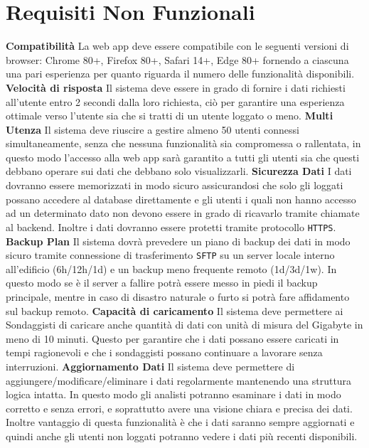 \chapter{Requisiti Non Funzionali} 
    \begin{rnfList}
        \rnfItem \textbf{Compatibilità} La web app deve essere compatibile con le seguenti versioni di browser: Chrome 80+, Firefox 80+, Safari 14+, Edge 80+ fornendo a ciascuna una pari esperienza per quanto riguarda il numero delle funzionalità disponibili.
        \rnfItem \textbf{Velocità di risposta} Il sistema deve essere in grado di fornire i dati richiesti all’utente entro 2 secondi dalla loro richiesta, ciò per garantire una esperienza ottimale verso l’utente sia che si tratti di un utente loggato o meno.
        \rnfItem \textbf{Multi Utenza} Il sistema deve riuscire a gestire almeno 50 utenti connessi simultaneamente, senza che nessuna funzionalità sia compromessa o rallentata, in questo modo l'accesso alla web app sarà garantito a tutti gli utenti sia che questi debbano operare sui dati che debbano solo visualizzarli.
        \rnfItem \textbf{Sicurezza Dati} I dati dovranno essere memorizzati in modo sicuro assicurandosi che solo gli loggati possano accedere al database direttamente e gli utenti i quali non hanno accesso ad un determinato dato non devono essere in grado di ricavarlo tramite chiamate al backend. Inoltre i dati dovranno essere protetti tramite protocollo \texttt{HTTPS}.
        \rnfItem \textbf{Backup Plan} Il sistema dovrà prevedere un piano di backup dei dati in modo sicuro tramite connessione di trasferimento \texttt{SFTP} su un server locale interno all'edificio (6h/12h/1d) e un backup meno frequente remoto (1d/3d/1w). In questo modo se è il server a fallire potrà essere messo in piedi il backup principale, mentre in caso di disastro naturale o furto si potrà fare affidamento sul backup remoto.
        \rnfItem \textbf{Capacità di caricamento} Il sistema deve permettere ai Sondaggisti di caricare anche quantità di dati con unità di misura del Gigabyte in meno di 10 minuti. Questo per garantire che i dati possano essere caricati in tempi ragionevoli e che i sondaggisti possano continuare a lavorare senza interruzioni.
        \rnfItem \textbf{Aggiornamento Dati} Il sistema deve permettere di aggiungere/modificare/eliminare i dati regolarmente mantenendo una struttura logica intatta. In questo modo gli analisti potranno esaminare i dati in modo corretto e senza errori, e soprattutto avere una visione chiara e precisa dei dati. Inoltre vantaggio di questa funzionalità è che i dati saranno sempre aggiornati e quindi anche gli utenti non loggati potranno vedere i dati più recenti disponibili.

\end{rnfList}
